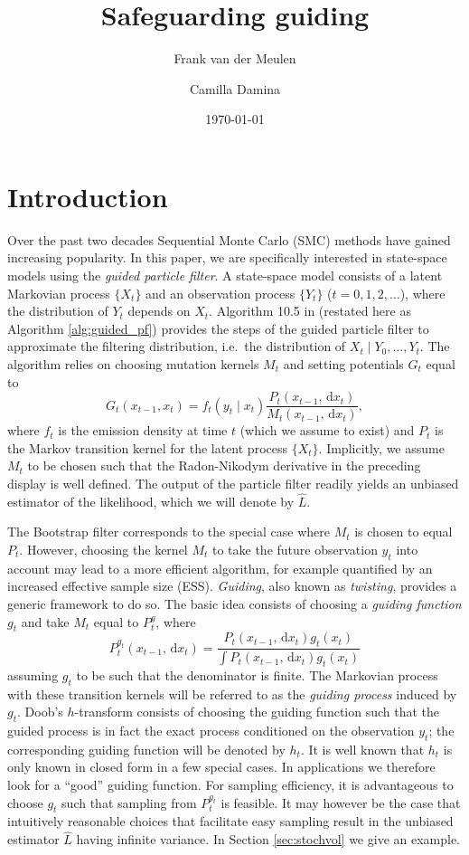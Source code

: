 \documentclass[11pt,reqno]{amsart}
\title{Safeguarding guiding}
\date{\today}
\author{Frank van der Meulen}
\author{Camilla Damina}
\newcommand{\dd}{{\,\mathrm d}}
\theoremstyle{definition}
\begin{document}
\maketitle
\tableofcontents

\section{Introduction}
Over the past two decades Sequential Monte Carlo (SMC) methods have gained increasing popularity. In this paper, we are specifically interested in state-space models using the {\it guided particle filter}. A state-space model consists of a  latent Markovian process  $\{X_t\}$ and an observation process $\{Y_t\}$ ($t=0,1,2,\ldots$), where the distribution of $Y_t$ depends on $X_t$. Algorithm 10.5 in \cite{CP}  (restated here as Algorithm \ref{alg:guided_pf})  provides the steps of the guided particle  filter to approximate the filtering distribution, i.e.\ the distribution of $X_t \mid Y_0,\ldots, Y_t$.  The algorithm relies on choosing  mutation kernels $M_t$ and setting potentials $G_t$ equal to 
\[ G_t(x_{t-1},x_t) = f_t(y_t \mid x_t) \frac{P_t(x_{t-1}, \dd x_t)}{M_t(x_{t-1}, \dd x_t)}, 
\] where $f_t$ is the emission density at time $t$ (which we assume to exist) and $P_t$ is the Markov transition kernel for the latent process $\{X_t\}$. Implicitly, we assume $M_t$ to be chosen such that the Radon-Nikodym derivative in the preceding display is well defined. The output of the particle filter readily yields an unbiased estimator of the likelihood, which we will denote by  $\hat L$.



The Bootstrap filter corresponds to the  special case where $M_t$ is chosen to equal $P_t$. However, choosing the kernel $M_t$ to take the future observation $y_t$ into account may lead to a more efficient algorithm,  for example quantified by an increased effective sample size (ESS). 
{\it Guiding}, also known as {\it twisting}, provides a generic framework to do so. The basic idea consists of choosing a {\it guiding function} $g_t$ and take $M_t$ equal to $P^g_t$, where
\[ P_t^{g_t}(x_{t-1}, \dd x_t) = \frac{P_t(x_{t-1}, \dd x_t) g_t(x_t)}{\int P_t(x_{t-1}, \dd x_t) g_t(x_t)} \]
assuming $g_t$ to be such that  the denominator is finite. The Markovian process with these transition kernels will be referred to as the {\it guiding process} induced by $g_t$. Doob's $h$-transform consists of choosing the guiding function such that the guided process is in fact the exact process conditioned on the observation $y_t$; the corresponding guiding function will be denoted by $h_t$. It is well known that $h_t$ is only known in closed form in a few special cases.   In applications we therefore look for a ``good'' guiding function.  For sampling efficiency, it is advantageous to choose $g_t$ such that sampling from $P^{g_t}_t$ is feasible. It may however be the case that intuitively reasonable choices that facilitate easy sampling result in  the unbiased estimator  $\hat L$ having infinite variance. In Section \ref{sec:stochvol} we give an example. 
\end{document}
